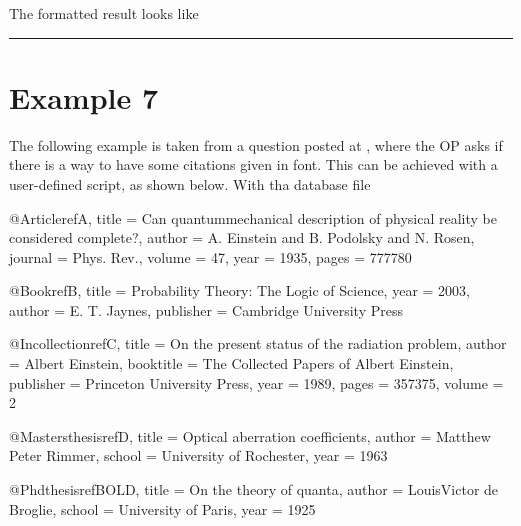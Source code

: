 \documentclass[letterpaper,10pt,english]{sphinxmanual}
\begin{document}
The formatted result looks like

\noindent{}


\bigskip\hrule\bigskip



\section{Example 7}
\label{\detokenize{examples:example-7}}
The following example is taken from a question posted at , where the OP asks if there is a way to have some citations given in  font. This can be achieved with a user-defined script, as shown below. With tha database file

%
\begin{sphinxVerbatim}[commandchars=\\\{\}]
@Article\PYGZob{}refA,
  title = \PYGZob{}Can quantum\PYGZhy{}mechanical description of physical reality be considered complete?\PYGZcb{},
  author = \PYGZob{}A. Einstein and B. Podolsky and N. Rosen\PYGZcb{},
  journal = \PYGZob{}Phys.\PYGZbs{} Rev.\PYGZcb{},
  volume = \PYGZob{}47\PYGZcb{},
  year = \PYGZob{}1935\PYGZcb{},
  pages = \PYGZob{}777\PYGZhy{}\PYGZhy{}780\PYGZcb{}
\PYGZcb{}

@Book\PYGZob{}refB,
  title = \PYGZob{}Probability Theory: The Logic of Science\PYGZcb{},
  year = \PYGZob{}2003\PYGZcb{},
  author = \PYGZob{}E. T. Jaynes\PYGZcb{},
  publisher = \PYGZob{}Cambridge University Press\PYGZcb{}
\PYGZcb{}

@Incollection\PYGZob{}refC,
  title = \PYGZob{}On the present status of the radiation problem\PYGZcb{},
  author = \PYGZob{}Albert Einstein\PYGZcb{},
  booktitle = \PYGZob{}The Collected Papers of Albert Einstein\PYGZcb{},
  publisher = \PYGZob{}Princeton University Press\PYGZcb{},
  year = \PYGZob{}1989\PYGZcb{},
  pages = \PYGZob{}357\PYGZhy{}\PYGZhy{}375\PYGZcb{},
  volume = \PYGZob{}2\PYGZcb{}
\PYGZcb{}

@Mastersthesis\PYGZob{}refD,
  title = \PYGZob{}Optical aberration coefficients\PYGZcb{},
  author = \PYGZob{}Matthew Peter Rimmer\PYGZcb{},
  school = \PYGZob{}University of Rochester\PYGZcb{},
  year = \PYGZob{}1963\PYGZcb{}
\PYGZcb{}

@Phdthesis\PYGZob{}refBOLD,
  title = \PYGZob{}On the theory of quanta\PYGZcb{},
  author = \PYGZob{}Louis\PYGZhy{}Victor de Broglie\PYGZcb{},
  school = \PYGZob{}University of Paris\PYGZcb{},
  year = \PYGZob{}1925\PYGZcb{}
\PYGZcb{}
\end{sphinxVerbatim}
\end{document}

